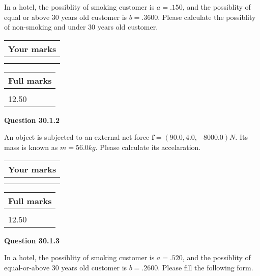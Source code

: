 \documentclass[12pt]{article}
\begin{document}
  
In a hotel, the possiblity of  %
smoking customer is
$a =  %
.150$, and the possiblity of  %
equal or above 30 years old customer is $ b =  %
.3600$.
Please calculate the possiblity of  %
 non-smoking and  %
under 30 years old customer.
 

 

 
\vspace{0.3in}
  
\vspace{0.2in}
  
         \begin{tabular}{|l|}
\hline
 Your marks  \\
\hline
 \\ 
 \\ 
\hline
\end{tabular}
\hspace{0.05in} \begin{tabular}{|l|}
\hline
 Full marks  \\
\hline
 \\ 
12.50 \\
\hline
\end{tabular}
{\textbf{\Large{Question
30.1.2 
}}}
  
  
 
An object is subjected to an external net force $\mathbf{f}=(
90.0,  %
4.0,
-8000.0  )N$. Its mass is known as
$m= %
56.0 kg$. Please calculate its accelaration.
 
 

 

 
\vspace{0.3in}
  
\vspace{0.2in}
  
         \begin{tabular}{|l|}
\hline
 Your marks  \\
\hline
 \\ 
 \\ 
\hline
\end{tabular}
\hspace{0.05in} \begin{tabular}{|l|}
\hline
 Full marks  \\
\hline
 \\ 
12.50 \\
\hline
\end{tabular}
{\textbf{\Large{Question
30.1.3 
}}}
  
  
In a hotel, the possiblity of  %
smoking customer is
$a =  %
.520$, and the possiblity of  %
equal-or-above 30 years old customer is $ b =  %
.2600$.
Please fill the following form.
 
\end{document}
